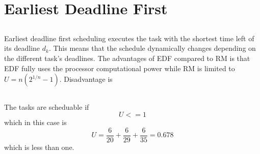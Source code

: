 \documentclass[12pt,a4paper]{article}
\begin{document}
\section{Earliest Deadline First} %
\subsection{}
Earliest deadline first scheduling executes the task with the shortest time left of its deadline $d_k$. This means that the schedule dynamically changes depending on the different task's deadlines. The advantages of EDF compared to RM is that EDF fully uses the processor computational power while RM is limited to $U=n(2^{1/n}-1)$. Disadvantage is 

\subsection{} %
The tasks are scheduable if 
\begin{equation}
U <= 1
\end{equation}
which in this case is
\begin{equation}
  U = \frac{6}{20}+\frac{6}{29}+\frac{6}{35}=0.678
\end{equation}
which is less than one. 
\end{document}
